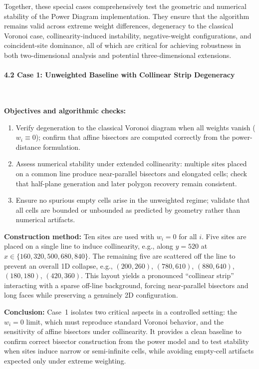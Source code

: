 \documentclass{article}
\begin{document}
Together, these special cases comprehensively test the geometric and numerical stability of the Power Diagram implementation.  
They ensure that the algorithm remains valid across extreme weight differences, degeneracy to the classical Voronoi case, collinearity-induced instability, negative-weight configurations, and coincident-site dominance, all of which are critical for achieving robustness in both two-dimensional analysis and potential three-dimensional extensions.
\paragraph{4.2 Case 1: Unweighted Baseline with Collinear Strip Degeneracy}\

\textbf{Objectives and algorithmic checks:}
\begin{enumerate}
    \item Verify degeneration to the classical Voronoi diagram when all weights vanish ($w_i\equiv 0$); confirm that affine bisectors are computed correctly from the power-distance formulation.
    \item Assess numerical stability under extended collinearity: multiple sites placed on a common line produce near-parallel bisectors and elongated cells; check that half-plane generation and later polygon recovery remain consistent.
    \item Ensure no spurious empty cells arise in the unweighted regime; validate that all cells are bounded or unbounded as predicted by geometry rather than numerical artifacts.
\end{enumerate}

\textbf{Construction method:}
Ten sites are used with $w_i=0$ for all $i$. Five sites are placed on a single line to induce collinearity, e.g., along $y=520$ at $x\in\{160, 320, 500, 680, 840\}$. The remaining five are scattered off the line to prevent an overall 1D collapse, e.g., $(200,260)$, $(780,610)$, $(880,640)$, $(180,180)$, $(420,360)$. This layout yields a pronounced “collinear strip” interacting with a sparse off-line background, forcing near-parallel bisectors and long faces while preserving a genuinely 2D configuration.

\textbf{Conclusion:}
Case~1 isolates two critical aspects in a controlled setting: the $w_i=0$ limit, which must reproduce standard Voronoi behavior, and the sensitivity of affine bisectors under collinearity. It provides a clean baseline to confirm correct bisector construction from the power model and to test stability when sites induce narrow or semi-infinite cells, while avoiding empty-cell artifacts expected only under extreme weighting.
\end{document}
